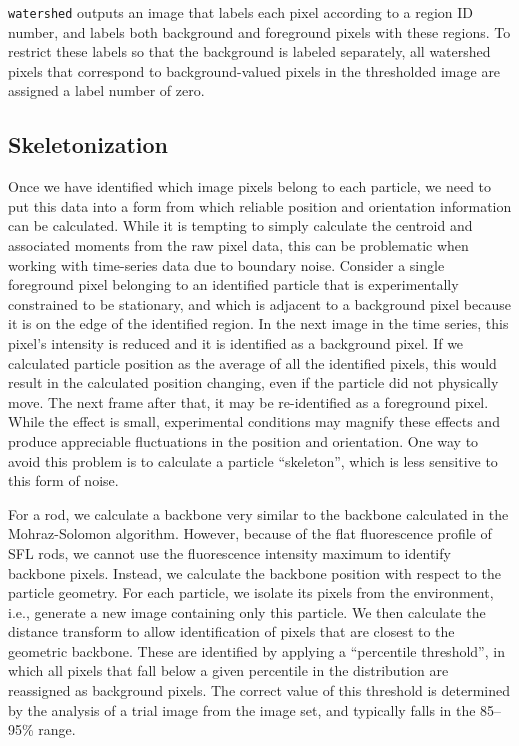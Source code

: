 \texttt{watershed} outputs an image that labels each pixel according to a region ID number, and labels both background
and foreground pixels with these regions. To restrict these labels so that the background is labeled separately, all 
watershed pixels that correspond to background-valued pixels in the thresholded image are assigned a label number of zero.

\subsection{Skeletonization}

Once we have identified which image pixels belong to each particle, we need to put this data into a form from
which reliable position and orientation information can be calculated.  While it is tempting to simply
calculate the centroid and associated moments from the raw pixel data, this can be problematic when working with
time-series data due to boundary noise. Consider a single foreground pixel belonging to 
an identified particle that is experimentally
constrained to be stationary, and which is adjacent to a background pixel because it is on the edge of the identified 
region. In the next image in the time series, this pixel's intensity is reduced and it is identified as a background
pixel.  If we calculated particle position as the average of all the identified pixels, this would result in 
the calculated position changing, even if the particle did not physically move. The next frame after that, it 
may be re-identified as a foreground pixel.  While the effect is small, experimental conditions may magnify
these effects and produce appreciable fluctuations in the position and orientation. One way to 
avoid this problem
is to calculate a particle ``skeleton'', which is less sensitive to this form of noise.~\cite{soille-book}

For a rod, we calculate a backbone very similar to the backbone calculated in the Mohraz-Solomon algorithm.
However, because of the flat fluorescence profile of SFL rods,
we cannot use the fluorescence intensity maximum to identify backbone pixels. Instead, we calculate 
the backbone position with respect to the particle geometry. For each particle, we 
isolate its pixels from the environment, i.e., generate a new image containing only this particle. We then
calculate the distance transform to allow identification of pixels that are closest to the 
geometric backbone.  These are identified by applying a ``percentile threshold'', in which all pixels that
fall below a given percentile in the distribution are reassigned as background pixels. 
The correct value of this threshold is determined by the analysis of a trial image from the image set,
and typically falls in the 85--95\% range.

